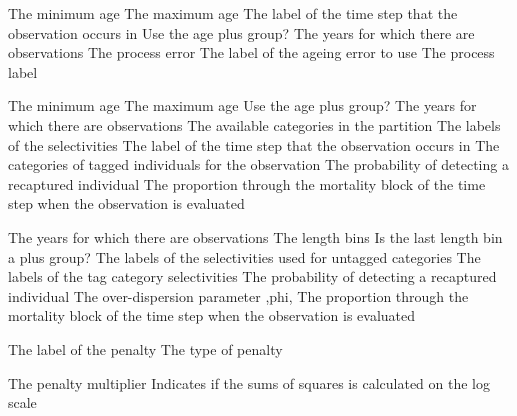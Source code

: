  {The minimum age}
 {The maximum age}
 {The label of the time step that the observation occurs in}
 {Use the age plus group?}
 {The years for which there are observations}
 {The process error}
 {The label of the ageing error to use}
 {The process label}
\par\textbf{}\par
{} {The minimum age}
 {The maximum age}
 {Use the age plus group?}
 {The years for which there are observations}
 {The available categories in the partition}
 {The labels of the selectivities}
 {The label of the time step that the observation occurs in}
 {The categories of tagged individuals for the observation}
 {The probability of detecting a recaptured individual}
 {The proportion through the mortality block of the time step when the observation is evaluated}
\par\textbf{}\par
{} {The years for which there are observations}
 {The length bins}
 {Is the last length bin a plus group?}
 {The labels of the selectivities used for untagged categories}
 {The labels of the tag category selectivities}
 {The probability of detecting a recaptured individual}
 {The over-dispersion parameter ,phi,}
 {The proportion through the mortality block of the time step when the observation is evaluated}
\par\par
{} {The label of the penalty}
 {The type of penalty}
\par\textbf{}\par
{} {The penalty multiplier}
 {Indicates if the sums of squares is calculated on the log scale}
\par\par
